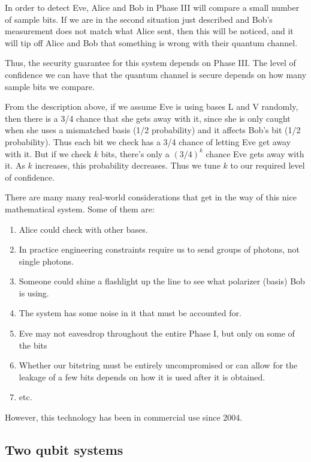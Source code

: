 \documentclass{article}
\theoremstyle{plain}
\theoremstyle{definition}
\theoremstyle{remark}
\numberwithin{theorem}{section}
\begin{document}
In order to detect Eve, Alice and Bob in Phase III will compare a small number of sample bits.  If we are in the second situation just described and Bob's measurement does not match what Alice sent, then this will be noticed, and it will tip off Alice and Bob that something is wrong with their quantum channel.

Thus, the security guarantee for this system depends on Phase III.  The level of confidence we can have that the quantum channel is secure depends on how many sample bits we compare.

From the description above, if we assume Eve is using bases L and V randomly, then there is a 3/4 chance that she gets away with it, since she is only caught when she uses a mismatched basis (1/2 probability) and it affects Bob's bit (1/2 probability).  Thus each bit we check has a 3/4 chance of letting Eve get away with it.  But if we check $k$ bits, there's only a $(3/4)^k$ chance Eve gets away with it.  As $k$ increases, this probability decreases. Thus we tune $k$ to our required level of confidence.

There are many many real-world considerations that get in the way of this nice mathematical system.  Some of them are:

\begin{enumerate}
    \item Alice could check with other bases.
    \item In practice engineering constraints require us to send groups of photons, not single photons.
    \item Someone could shine a flashlight up the line to see what polarizer (basis) Bob is using.
    \item The system has some noise in it that must be accounted for.
    \item Eve may not eavesdrop throughout the entire Phase I, but only on some of the bits
    \item Whether our bitstring must be entirely uncompromised or can allow for the leakage of a few bits depends on how it is used after it is obtained.
    \item etc.
\end{enumerate}

However, this technology has been in commercial use since 2004.






\subsection{Two qubit systems}
\end{document}

